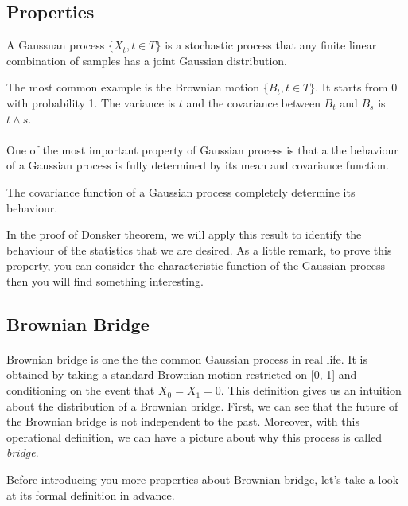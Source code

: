 \documentclass[final_project_1.tex]{subfiles}
\begin{document}
\subsection{Properties}

\begin{definition}
A Gaussuan process $\{X_t,t\in T\}$ is a stochastic process that any finite linear combination of samples has a joint Gaussian distribution.
\end{definition}
The most common example is the Brownian motion $\{B_t,t\in T\}$. It starts from 0 with probability 1. The variance is $t$ and the covariance between $B_t$ and $B_s$ is $t\wedge s$.
\paragraph{}
One of the most important property of Gaussian process is that a the behaviour of a Gaussian process is fully determined by its mean and covariance function.
\begin{property}
The covariance function of a Gaussian process completely determine its behaviour.
\end{property}
In the proof of Donsker theorem, we will apply this result to identify the behaviour of the statistics that we are desired. As a little remark, to prove this property, you can consider the characteristic function of the Gaussian process then you will find something interesting.

\subsection{Brownian Bridge}

\paragraph{}
Brownian bridge is one the the common Gaussian process in real life. It is obtained by taking a standard Brownian motion restricted on [0, 1] and conditioning on the event that $X_0 = X_1=0$. This definition gives us an intuition about the distribution of a Brownian bridge. First, we can see that the future of the Brownian bridge is not independent to the past. Moreover, with this operational definition, we can have a picture about why this process is called {\it bridge}.

Before introducing you more properties about Brownian bridge, let's take a look at its formal definition in advance.
\end{document}
